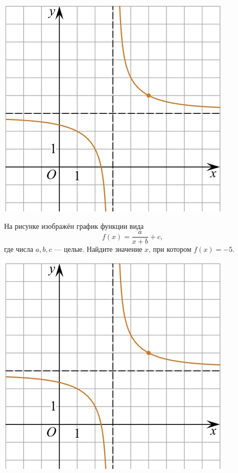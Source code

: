 \begin{consultation}
\begin{listofex}
\begin{minipage}[t]{\picwidth}
			\includegraphics[align=t, width=\linewidth]{../pics/G101M4C6-2.jpg}
		\end{minipage}
		\item
		\begin{minipage}[t]{\bodywidth}
			На рисунке изображён график функции вида \[ f(x)=\dfrac{a}{x+b}+c, \] где числа \(a, b, c\) --- целые. Найдите значение \(x\), при котором \(f(x)=-5\).
		\end{minipage}
		\hspace{0.02\linewidth}
		\begin{minipage}[t]{\picwidth}
			\includegraphics[align=t, width=\linewidth]{../pics/G101M4C6-2.jpg}

\end{minipage}
\end{listofex}
\end{consultation}

